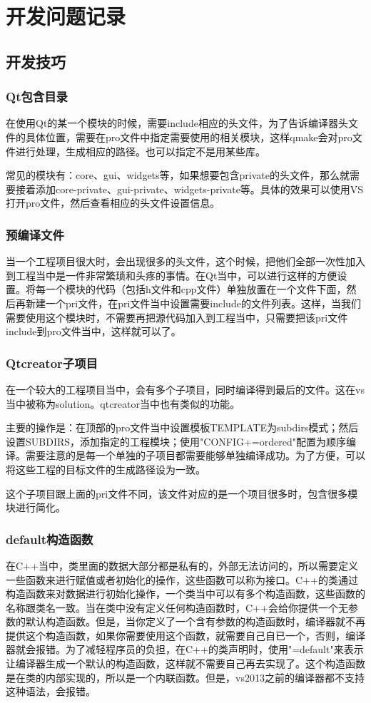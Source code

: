 \chapter{开发问题记录}

\section{开发技巧}   

\subsection{Qt包含目录}
在使用Qt的某一个模块的时候，需要include相应的头文件，为了告诉编译器头文件的具体位置，需要在pro文件中指定需要使用的相关模块，这样qmake会对pro文件进行处理，生成相应的路径。也可以指定不是用某些库。

常见的模块有：core、gui、widgets等，如果想要包含private的头文件，那么就需要接着添加core-private、gui-private、widgets-private等。具体的效果可以使用VS打开pro文件，然后查看相应的头文件设置信息。          

\subsection{预编译文件}
当一个工程项目很大时，会出现很多的头文件，这个时候，把他们全部一次性加入到工程当中是一件非常繁琐和头疼的事情。在Qt当中，可以进行这样的方便设置。将每一个模块的代码（包括h文件和cpp文件）单独放置在一个文件下面，然后再新建一个pri文件，在pri文件当中设置需要include的文件列表。这样，当我们需要使用这个模块时，不需要再把源代码加入到工程当中，只需要把该pri文件include到pro文件当中，这样就可以了。

\subsection{Qtcreator子项目}
在一个较大的工程项目当中，会有多个子项目，同时编译得到最后的文件。这在vs当中被称为solution。qtcreator当中也有类似的功能。

主要的操作是：在顶部的pro文件当中设置模板TEMPLATE为subdirs模式；然后设置SUBDIRS，添加指定的工程模块；使用"CONFIG+=ordered"配置为顺序编译。需要注意的是每一个单独的子项目都需要能够单独编译成功。为了方便，可以将这些工程的目标文件的生成路径设为一致。

这个子项目跟上面的pri文件不同，该文件对应的是一个项目很多时，包含很多模块进行简化。

\subsection{default构造函数}
在C++当中，类里面的数据大部分都是私有的，外部无法访问的，所以需要定义一些函数来进行赋值或者初始化的操作，这些函数可以称为接口。C++的类通过构造函数来对数据进行初始化操作，一个类当中可以有多个构造函数，这些函数的名称跟类名一致。当在类中没有定义任何构造函数时，C++会给你提供一个无参数的默认构造函数。但是，当你定义了一个含有参数的构造函数时，编译器就不再提供这个构造函数，如果你需要使用这个函数，就需要自己自已一个，否则，编译器就会报错。为了减轻程序员的负担，在C++的类声明时，使用"=default"来表示让编译器生成一个默认的构造函数，这样就不需要自己再去实现了。这个构造函数是在类的内部实现的，所以是一个内联函数。但是，vs2013之前的编译器都不支持这种语法，会报错。

